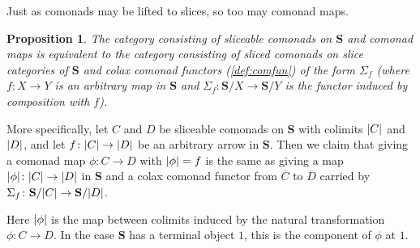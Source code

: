 \documentclass[11pt, oneside, article]{memoir}
\theoremstyle{plain}
\newtheorem{proposition}[theorem]{Proposition}
\theoremstyle{definition}
\theoremstyle{remark}
\newenvironment{remark}
{\renewcommand\qedsymbol{$\lrcorner$}%
  \pushQED{\qed}\myremark}
{\popQED\endmyremark}
\DeclarePairedDelimiter{\abs}{\lvert}{\rvert}
\newcommand{\bang}{\mathrm{!}}
\newcommand{\cat}[1]{\mathbf{#1}}
\newcommand{\CoalgOn}[2]{{#2}^{#1}}
\newcommand{\CoalgS}[1]{\CoalgOn{#1}{\bS}}
\newcommand{\clift}[1]{\overline{#1}}
\newcommand{\pts}[1]{{\abs{#1}}}
\newcommand{\one}[1]{\pts{#1}}
\newcommand{\ptlift}[1]{\overline{#1}}
\newcommand{\carr}{\Sigma}
\newcommand{\leindex}[1]{\Sigma_{#1}}
\newcommand{\slicel}{\Sigma_\bang}
\newcommand{\car}[1]{\carr^{#1}}
\newcommand{\carC}{\car{\cC}}
\newcommand{\cmnd}[1]{{#1}}
\newcommand{\xX}{X}
\newcommand{\xY}{Y}
\newcommand{\cC}{\cmnd{C}}
\newcommand{\cD}{\cmnd{D}}
\newcommand{\bS}{\cat{S}}
\newcommand{\CS}{\CoalgS{\cC}}
\newcommand{\SC}{\bS/\pts{\cC}}
\newcommand{\SD}{\bS/\pts{\cD}}
\begin{document}

Just as comonads may be lifted to slices, so too may comonad maps.

\begin{proposition}\label{prop:comtfae}
  The category consisting of sliceable comonads on $\bS$ and comonad
  maps is equivalent to the category consisting of sliced comonads on
  slice categories of $\bS$ and colax comonad functors
  (\cref{def:comfun}) of the form $\leindex{f}$ (where
  $f \colon \xX \to \xY$ is an arbitrary map in $\bS$ and
  $\leindex{f} \colon \bS/\xX \to \bS/\xY$ is the functor induced by
  composition with $f$).
\end{proposition}

More specifically, let $\cC$ and $\cD$ be sliceable comonads on $\bS$
with colimits $\pts{\cC}$ and $\pts{\cD}$, and let
$f \colon \pts{\cC} \to \pts{\cD}$ be an arbitrary arrow in
$\bS$. Then we claim that giving a comonad map
$\phi \colon \cC \to \cD$ with $\one{\phi} = f$ is the same as giving
a map $\one{\phi} \colon \pts{\cC} \to \pts{\cD}$ in $\bS$ and a colax
comonad functor from $\clift{\cC}$ to
$\clift{\cD}$ carried by $\leindex{f} \colon \SC \to \SD$.

Here $\one{\phi}$ is the map between colimits induced by the natural
transformation $\phi \colon \cC \to \cD$. In the case $\bS$ has a
terminal object $1$, this is the component of $\phi$ at $1$.
\end{document}
